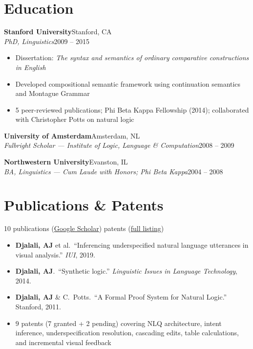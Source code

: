 \documentclass[9pt,letterpaper]{extarticle}
\newcommand{\entry}[4]{%
  \noindent\textbf{\color{dark}#1}\hfill\textcolor{ltgray}{\small #2}\\[-0.1em]
  \textit{\color{medgray}#3}\hfill\textcolor{ltgray}{\small #4}\par
}
\begin{document}
\section{Education}

\entry{Stanford University}{Stanford, CA}
      {PhD, Linguistics}{2009 -- 2015}
\begin{itemize}
  \item Dissertation: \textit{The syntax and semantics of ordinary comparative constructions in English}
  \item Developed compositional semantic framework using continuation semantics and Montague Grammar
  \item 5 peer-reviewed publications; Phi Beta Kappa Fellowship (2014); collaborated with Christopher Potts on natural logic
\end{itemize}

\vspace{0.08em}

\entry{University of Amsterdam}{Amsterdam, NL}
      {Fulbright Scholar --- Institute of Logic, Language \& Computation}{2008 -- 2009}

\vspace{0.08em}

\entry{Northwestern University}{Evanston, IL}
      {BA, Linguistics --- Cum Laude with Honors; Phi Beta Kappa}{2004 -- 2008}

\section{Publications \& Patents}
\vspace{-0.3em}
{\small\textcolor{ltgray}{10 publications (\href{https://scholar.google.com/citations?user=nNk4g6oAAAAJ}{Google Scholar}) \enspace\textperiodcentered{} patents (\href{https://alexdjalali.github.io/publications/}{full listing})}}\par\vspace{0.15em}

\begin{itemize}
  \item \textbf{Djalali, AJ} et al.\ ``Inferencing underspecified natural language utterances in visual analysis.'' \textit{IUI}, 2019.
  \item \textbf{Djalali, AJ}.\ ``Synthetic logic.'' \textit{Linguistic Issues in Language Technology}, 2014.
  \item \textbf{Djalali, AJ} \& C.\ Potts.\ ``A Formal Proof System for Natural Logic.'' Stanford, 2011.
  \item 9 patents (7 granted + 2 pending) covering NLQ architecture, intent inference, underspecification resolution, cascading edits, table calculations, and incremental visual feedback
\end{itemize}
\end{document}
